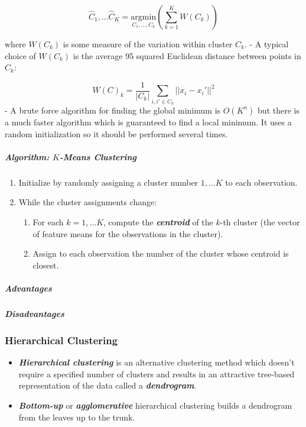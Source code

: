 \documentclass[11pt]{article}
\providecommand{\tightlist}{%
      \setlength{\itemsep}{0pt}\setlength{\parskip}{0pt}}
\begin{document}
\[\hat{C}_1, \dots \hat{C}_K = \underset{C_1, \dots, C_k}{\text{argmin}}\left(\sum_{k = 1}^K W(C_k)\right)\]

where \(W(C_k)\) is some measure of the variation within cluster
\(C_k\). - A typical choice of \(W(C_k)\) is the average 95 squared
Euclidean distance between points in \(C_k\):

\[W(C)_k = \frac{1}{|C_k|}\sum_{i, i' \in C_k} ||x_i - x_i'||^2\] - A
brute force algorithm for finding the global minimum is \(O(K^n)\) but
there is a much faster algorithm which is guaranteed to find a local
minimum. It uses a random initialization so it should be performed
several times.

    \hypertarget{algorithm-k-means-clustering}{%
\subparagraph{\texorpdfstring{Algorithm: \(K\)-Means
Clustering}{Algorithm: K-Means Clustering}}\label{algorithm-k-means-clustering}}

    \begin{enumerate}
\def\labelenumi{\arabic{enumi}.}
\tightlist
\item
  Initialize by randomly assigning a cluster number \(1,\dots K\) to
  each observation.
\item
  While the cluster assignments change:

  \begin{enumerate}
  \def\labelenumii{\arabic{enumii}.}
  \tightlist
  \item
    For each \(k = 1, \dots K\), compute the \textbf{\emph{centroid}} of
    the \(k\)-th cluster (the vector of feature means for the
    observations in the cluster).
  \item
    Assign to each observation the number of the cluster whose centroid
    is closest.
  \end{enumerate}
\end{enumerate}

    \hypertarget{advantages}{%
\subparagraph{Advantages}\label{advantages}}

    \hypertarget{disadvantages}{%
\subparagraph{Disadvantages}\label{disadvantages}}

    \hypertarget{hierarchical-clustering}{%
\subsubsection{Hierarchical Clustering}\label{hierarchical-clustering}}

    \begin{itemize}
\tightlist
\item
  \textbf{\emph{Hierarchical clustering}} is an alternative clustering
  method which doesn't require a specified number of clusters and
  results in an attractive tree-based representation of the data called
  a \textbf{\emph{dendrogram}}.
\item
  \textbf{\emph{Bottom-up}} or \textbf{\emph{agglomerative}}
  hierarchical clustering builds a dendrogram from the leaves up to the
  trunk.
\end{itemize}
\end{document}
